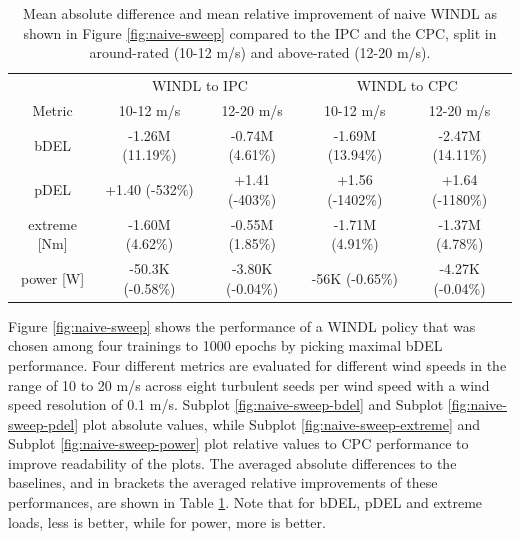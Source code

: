 \begin{table}[hbt!]
  \centering
  \begin{tabular}{c@{\hskip 0.7cm}cc@{\hskip 0.7cm}cc}
    \toprule
    & \multicolumn{2}{c}{WINDL to IPC} & \multicolumn{2}{c}{WINDL to CPC} \\
    Metric & 10-12 m/s & 12-20 m/s & 10-12 m/s & 12-20 m/s \\
    \midrule
    bDEL & -1.26M (11.19\%) & -0.74M (4.61\%) & -1.69M (13.94\%) & -2.47M (14.11\%) \\
    pDEL & +1.40 (-532\%) & +1.41 (-403\%) & +1.56 (-1402\%) & +1.64 (-1180\%) \\
    extreme [Nm] & -1.60M (4.62\%) & -0.55M (1.85\%) & -1.71M (4.91\%) & -1.37M (4.78\%) \\
    power [W] & -50.3K (-0.58\%) & -3.80K (-0.04\%) & -56K (-0.65\%) & -4.27K (-0.04\%) \\
    \bottomrule
  \end{tabular}
  \caption{Mean absolute difference and mean relative improvement of naive WINDL as shown in Figure \ref{fig:naive-sweep} compared to the IPC and the CPC, split in around-rated (10-12 m/s) and above-rated (12-20 m/s).}
  \label{table:naive-improvements}
\end{table}

Figure \ref{fig:naive-sweep} shows the performance of a WINDL policy that was chosen among four trainings to 1000 epochs by picking maximal bDEL performance. Four different metrics are evaluated for different wind speeds in the range of 10 to 20 m/s across eight turbulent seeds per wind speed with a wind speed resolution of 0.1 m/s. Subplot \ref{fig:naive-sweep-bdel} and Subplot \ref{fig:naive-sweep-pdel} plot absolute values, while Subplot \ref{fig:naive-sweep-extreme} and Subplot \ref{fig:naive-sweep-power} plot relative values to CPC performance to improve readability of the plots. The averaged absolute differences to the baselines, and in brackets the averaged relative improvements of these performances, are shown in Table \ref{table:naive-improvements}. Note that for bDEL, pDEL and extreme loads, less is better, while for power, more is better.

